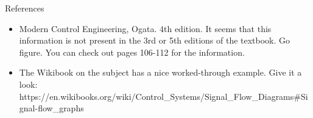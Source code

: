 \documentclass{../templates/topic}
\begin{document}
\begin{section}{References}
	\begin{itemize}
		\item Modern Control Engineering, Ogata. 4th edition. It seems that this information is not present in the 3rd or 5th editions of the textbook. Go figure. You can check out pages 106-112 for the information.
		\item The Wikibook on the subject has a nice worked-through example. Give it a look: https://en.wikibooks.org/wiki/Control\_Systems/Signal\_Flow\_Diagrams\#Signal-flow\_graphs
	\end{itemize}
	
\end{section}
\end{document}
